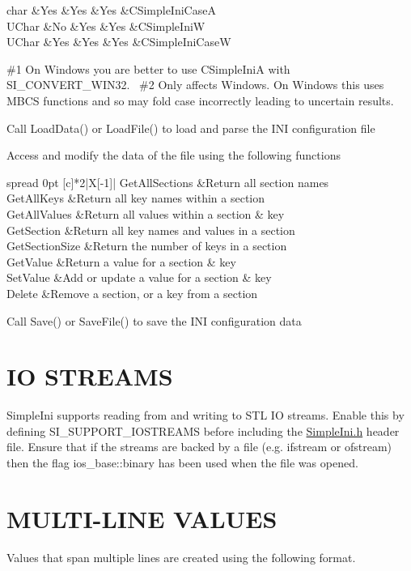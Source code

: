 \begin{DoxyEnumerate}
\begin{longtabu}
char &Yes &Yes &Yes &C\+Simple\+Ini\+CaseA \\
U\+Char &No &Yes &Yes &C\+Simple\+IniW \\
U\+Char &Yes &Yes &Yes &C\+Simple\+Ini\+CaseW \\
\end{longtabu}
\#1 On Windows you are better to use C\+Simple\+IniA with S\+I\+\_\+\+C\+O\+N\+V\+E\+R\+T\+\_\+\+W\+I\+N32.~\newline
 \#2 Only affects Windows. On Windows this uses M\+B\+CS functions and so may fold case incorrectly leading to uncertain results.
\item Call Load\+Data() or Load\+File() to load and parse the I\+NI configuration file
\item Access and modify the data of the file using the following functions \tabulinesep=1mm
\begin{longtabu} spread 0pt [c]{*2{|X[-1]}|}
\hline
Get\+All\+Sections &Return all section names \\
Get\+All\+Keys &Return all key names within a section \\
Get\+All\+Values &Return all values within a section \& key \\
Get\+Section &Return all key names and values in a section \\
Get\+Section\+Size &Return the number of keys in a section \\
Get\+Value &Return a value for a section \& key \\
Set\+Value &Add or update a value for a section \& key \\
Delete &Remove a section, or a key from a section \\
\end{longtabu}

\item Call Save() or Save\+File() to save the I\+NI configuration data
\end{DoxyEnumerate}\hypertarget{index_iostreams}{}\section{I\+O S\+T\+R\+E\+A\+MS}\label{index_iostreams}
Simple\+Ini supports reading from and writing to S\+TL IO streams. Enable this by defining S\+I\+\_\+\+S\+U\+P\+P\+O\+R\+T\+\_\+\+I\+O\+S\+T\+R\+E\+A\+MS before including the \hyperlink{_simple_ini_8h_source}{Simple\+Ini.\+h} header file. Ensure that if the streams are backed by a file (e.\+g. ifstream or ofstream) then the flag ios\+\_\+base\+::binary has been used when the file was opened.\hypertarget{index_multiline}{}\section{M\+U\+L\+T\+I-\/\+L\+I\+N\+E V\+A\+L\+U\+ES}\label{index_multiline}
Values that span multiple lines are created using the following format.


